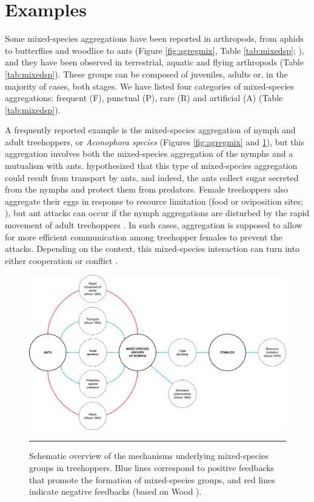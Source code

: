	\section{Examples}
Some mixed-species aggregations have been reported in arthropods, from aphids to butterflies and woodlice to ants (Figure \ref{fig:agregmix}, Table \ref{tab:mixedsp}; \cite{costa_other_2006}), and they have been observed in terrestrial, aquatic and flying arthropods (Table \ref{tab:mixedsp}). These groups can be composed of juveniles, adults or, in the majority of cases, both stages. We have listed four categories of mixed-species aggregations: frequent (F), punctual (P), rare (R) and artificial (A) (Table \ref{tab:mixedsp}). 

A frequently reported example is the mixed-species aggregation of nymph and adult treehoppers, or \textit{Aconophora species} (Figures \ref{fig:agregmix} and \ref{fig:acono}), but this aggregation involves both the mixed-species aggregation of the nymphs and a mutualism with ants. \cite{wood_diversity_1993} hypothesized that this type of mixed-species aggregation could result from transport by ants, and indeed, the ants collect sugar secreted from the nymphs and protect them from predators. Female treehoppers also aggregate their eggs in response to resource limitation (food or oviposition sites; \cite{wood_sociality_1979}), but ant attacks can occur if the nymph aggregations are disturbed by the rapid movement of adult treehoppers \cite{wood_diversity_1993}. In such cases, aggregation is supposed to allow for more efficient communication among treehopper females to prevent the attacks. Depending on the context, this mixed-species interaction can turn into either cooperation \cite{olmstead_effect_1990} or conflict \cite{wood_diversity_1993}.

 \begin{figure}[ht]
	\centering
		\includegraphics[width=0.9 \textwidth]{Figures/acono.png}
		\rule{35em}{0.5pt}
	\caption[Acono]{ Schematic overview of the mechanisms underlying mixed-species groups in treehoppers. Blue lines correspond to positive feedbacks that promote the formation of mixed-species groups, and red lines indicate negative feedbacks (based on Wood \citep{wood_sociality_1979,wood_diversity_1993}).}
	\label{fig:acono}

\end{figure}

